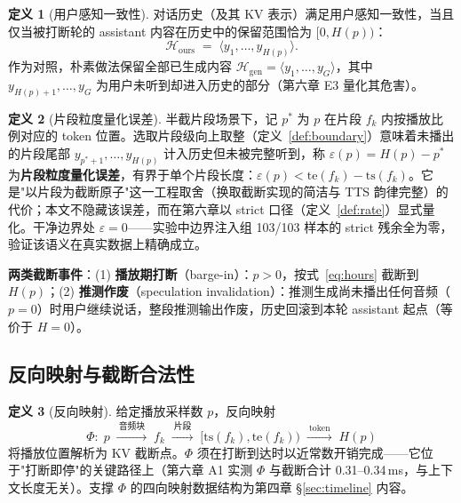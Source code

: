 \documentclass[conference]{IEEEtran}
\theoremstyle{definition}
\newtheorem{definition}{定义}
\begin{document}
\begin{definition}[用户感知一致性]\label{def:consistency}
对话历史（及其 KV 表示）满足用户感知一致性，当且仅当被打断轮的 assistant 内容在历史中的保留范围恰为 $[0, H(p))$：
\begin{equation}
\mathcal{H}_{\text{ours}} \;=\; \langle y_1, \dots, y_{H(p)} \rangle. \label{eq:hours}
\end{equation}
作为对照，朴素做法保留全部已生成内容 $\mathcal{H}_{\text{gen}} = \langle y_1, \dots, y_G \rangle$，其中 $y_{H(p)+1}, \dots, y_G$ 为用户未听到却进入历史的部分（第六章 E3 量化其危害）。
\end{definition}

\begin{definition}[片段粒度量化误差]\label{def:eps}
半截片段场景下，记 $p^\ast$ 为 $p$ 在片段 $f_k$ 内按播放比例对应的 token 位置。选取片段级向上取整（定义~\ref{def:boundary}）意味着未播出的片段尾部 $y_{p^\ast+1}, \dots, y_{H(p)}$ 计入历史但未被完整听到，称 $\varepsilon(p) = H(p) - p^\ast$ 为\textbf{片段粒度量化误差}，有界于单个片段长度：$\varepsilon(p) < \mathrm{te}(f_k)-\mathrm{ts}(f_k)$。它是"以片段为截断原子"这一工程取舍（换取截断实现的简洁与 TTS 韵律完整）的代价；本文不隐藏该误差，而在第六章以 strict 口径（定义~\ref{def:rate}）显式量化。干净边界处 $\varepsilon = 0$——实验中边界注入组 103/103 样本的 strict 残余全为零，验证该语义在真实数据上精确成立。
\end{definition}

\textbf{两类截断事件}：(1) \textbf{播放期打断}（barge-in）：$p > 0$，按式~\eqref{eq:hours} 截断到 $H(p)$；(2) \textbf{推测作废}（speculation invalidation）：推测生成尚未播出任何音频（$p = 0$）时用户继续说话，整段推测输出作废，历史回滚到本轮 assistant 起点（等价于 $H = 0$）。

\subsection{反向映射与截断合法性}

\begin{definition}[反向映射]\label{def:phi}
给定播放采样数 $p$，反向映射
$$\Phi:\; p \;\xrightarrow{\ \text{音频块}\ }\; f_k \;\xrightarrow{\ \text{片段}\ }\; [\mathrm{ts}(f_k), \mathrm{te}(f_k)) \;\xrightarrow{\ \text{token}\ }\; H(p)$$
将播放位置解析为 KV 截断点。$\Phi$ 须在打断到达时以近常数开销完成——它位于"打断即停"的关键路径上（第六章 A1 实测 $\Phi$ 与截断合计 0.31--0.34\,ms，与上下文长度无关）。支撑 $\Phi$ 的四向映射数据结构为第四章 \S\ref{sec:timeline} 内容。
\end{definition}
\end{document}
